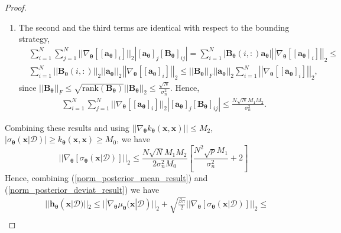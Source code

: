 \documentclass[jair,twoside,11pt,theapa]{article}
\theoremstyle{definition}
\begin{document}
\begin{proof}
\begin{enumerate}
    \item The second and the third terms are identical with respect to the bounding strategy,
    \begin{align*}
        &\sum_{i=1}^N\sum_{j=1}^N||\nabla_{\bm{\theta}}\left[[\bm{a}_{\bm{\theta}}]_i\right]||_2\left|[\bm{a}_{\bm{\theta}}]_j\left[\bm{B}_{\bm{\theta}}\right]_{ij}\right| = \nonumber
        \sum_{i=1}^N\left|\bm{B}_{\bm{\theta}}(i,:)\bm{a}_{\bm{\theta}}\right|\left|\left|\nabla_{\bm{\theta}}\left[[\bm{a}_{\bm{\theta}}]_i\right]\right|\right|_2 \le\\\nonumber
        &\sum_{i=1}^N\left|\left|\bm{B}_{\bm{\theta}}(i,:)\right|\right|_2\left|\left|\bm{a}_{\bm{\theta}}\right|\right|_2\left|\left|\nabla_{\bm{\theta}}\left[[\bm{a}_{\bm{\theta}}]_i\right]\right|\right|_2 \le \nonumber
        ||\bm{B}_{\bm{\theta}}||_F||\bm{a}_{\bm{\theta}}||_2\sum_{i=1}^N\left|\left|\nabla_{\bm{\theta}}\left[[\bm{a}_{\bm{\theta}}]_i\right]\right|\right|_2,
    \end{align*}
    since $||\bm{B}_{\bm{\theta}}||_F \le \sqrt{\text{rank}(\bm{B}_{\bm{\theta}})}||\bm{B}_{\bm{\theta}}||_2 \le \frac{\sqrt{N}}{\sigma^2_{n}}$. Hence,
    \begin{align*}
        &\sum_{i=1}^N\sum_{j=1}^N||\nabla_{\bm{\theta}}\left[[\bm{a}_{\bm{\theta}}]_i\right]||_2\left|[\bm{a}_{\bm{\theta}}]_j\left[\bm{B}_{\bm{\theta}}\right]_{ij}\right|\le \frac{N\sqrt{N}M_1M_2}{\sigma^2_n}.
    \end{align*}
\end{enumerate}
Combining these results and using $||\nabla_{\bm{\theta}}k_{\bm{\theta}}(\bm{x},\bm{x})|| \le M_2$,  $\left|\sigma_{\bm{\theta}}(\bm{x}|\mathcal{D})\right| \ge k_{\bm{\theta}}(\bm{x},\bm{x}) \ge M_0$, we have
\begin{equation}
\label{norm_posterior_deviat_result}
    \left|\left|\nabla_{\bm{\theta}}\left[\sigma_{\bm{\theta}}(\bm{x}|\mathcal{D})\right]\right|\right|_2 \le \frac{N\sqrt{N}M_1M_2}{2\sigma^2_nM_0}\left[\frac{N^2\sqrt{p}M_1}{\sigma^2_n}+2\right]
\end{equation}
Hence, combining (\ref{norm_posterior_mean_result}) and (\ref{norm_posterior_deviat_result})  we have
\begin{align*}
    &||\bm{h}_{\bm{\theta}}(\bm{x}|\mathcal{D})||_2\le \nonumber
    ||\nabla_{\boldsymbol{\theta}}\mu_{\bm{\theta}}(\bm{x}|\mathcal{D})||_2 + \sqrt{\frac{\beta\pi}{2}}\left|\left|\nabla_{\bm{\theta}}\left[\sigma_{\bm{\theta}}(\bm{x}|\mathcal{D})\right]\right|\right|_2 \le\\\nonumber

\end{align*}
\end{proof}
\end{document}
